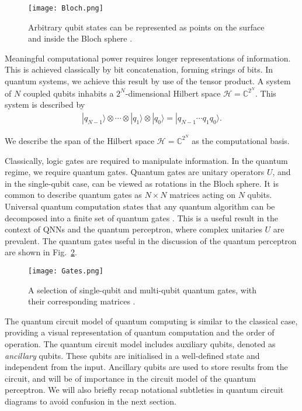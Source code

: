 \documentclass[twocolumn,superscriptaddress]{revtex4-1}
\begin{document}
\begin{figure}[t!]
\texttt{[image: Bloch.png]}
\caption{Arbitrary qubit states can be represented as points on the surface and inside the Bloch sphere \cite{Beer:2022wgv}.}
\label{fig:Bloch}
\end{figure}

Meaningful computational power requires longer representations of information. This is achieved classically by bit concatenation, forming strings of bits. In quantum systems, we achieve this result by use of the tensor product. A system of $N$ coupled qubits inhabits a $2^N$-dimensional Hilbert space $\mathcal{H} = \mathbb{C}^{2^N}$. This system is described by
\begin{equation} \label{eq:tensor}
\begin{split}
| q_{N-1} \rangle \otimes \cdots \otimes |q_1 \rangle \otimes |q_0 \rangle = |q_{N-1} \cdots q_1 q_0 \rangle .
\end{split}
\end{equation}

We describe the span of the Hilbert space $\mathcal{H} = \mathbb{C}^{2^N}$ as the computational basis.

Classically, logic gates are required to manipulate information. In the quantum regime, we require quantum gates. Quantum gates are unitary operators $U$, and in the single-qubit case, can be viewed as rotations in the Bloch sphere. It is common to describe quantum gates as $N \times N$ matrices acting on $N$ qubits. Universal quantum computation states that any quantum algorithm can be decomposed into a finite set of quantum gates \cite{Inaki2024}. This is a useful result in the context of QNNs and the quantum perceptron, where complex unitaries $U$ are prevalent. The quantum gates useful in the discussion of the quantum perceptron are shown in Fig.~\ref{fig:Gates}.

\begin{figure}[t!]
\texttt{[image: Gates.png]}
\caption{A selection of single-qubit and multi-qubit quantum gates, with their corresponding matrices \cite{wiki}.}
\label{fig:Gates}
\end{figure}

The quantum circuit model of quantum computing is similar to the classical case, providing a visual representation of quantum computation and the order of operation. The quantum circuit model includes auxiliary qubits, denoted as \textit{ancillary} qubits. These qubits are initialised in a well-defined state and independent from the input. Ancillary qubits are used to store results from the circuit, and will be of importance in the circuit model of the quantum perceptron. We will also briefly recap notational subtleties in quantum circuit diagrams to avoid confusion in the next section.
\end{document}
